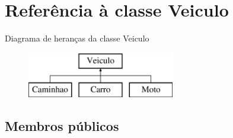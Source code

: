 \hypertarget{class_veiculo}{}\section{Referência à classe Veiculo}
\label{class_veiculo}
Diagrama de heranças da classe Veiculo\begin{figure}[H]
\begin{center}
\leavevmode
\includegraphics[height=2.000000cm]{class_veiculo}
\end{center}
\end{figure}
\subsection*{Membros públicos}
